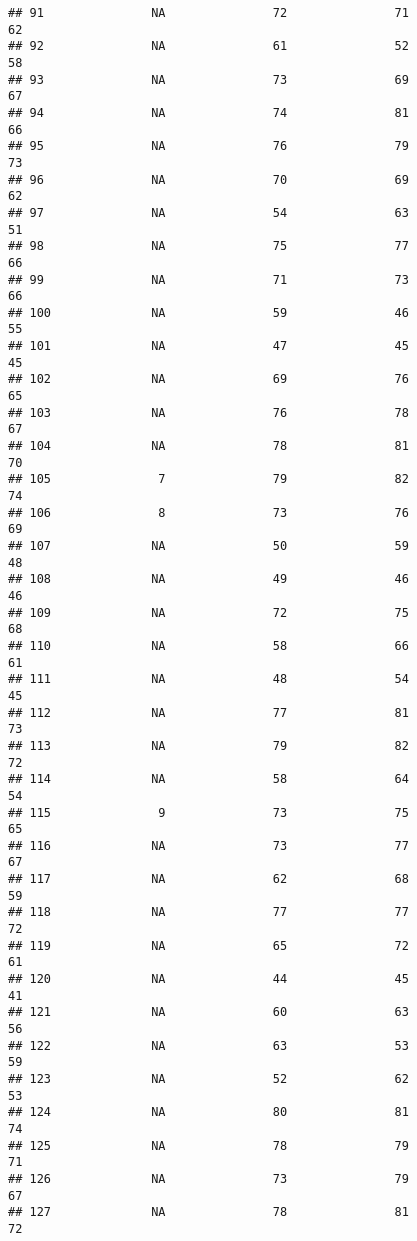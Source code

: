 \documentclass[]{article}
\begin{document}
\begin{verbatim}
## 91               NA               72               71             62
## 92               NA               61               52             58
## 93               NA               73               69             67
## 94               NA               74               81             66
## 95               NA               76               79             73
## 96               NA               70               69             62
## 97               NA               54               63             51
## 98               NA               75               77             66
## 99               NA               71               73             66
## 100              NA               59               46             55
## 101              NA               47               45             45
## 102              NA               69               76             65
## 103              NA               76               78             67
## 104              NA               78               81             70
## 105               7               79               82             74
## 106               8               73               76             69
## 107              NA               50               59             48
## 108              NA               49               46             46
## 109              NA               72               75             68
## 110              NA               58               66             61
## 111              NA               48               54             45
## 112              NA               77               81             73
## 113              NA               79               82             72
## 114              NA               58               64             54
## 115               9               73               75             65
## 116              NA               73               77             67
## 117              NA               62               68             59
## 118              NA               77               77             72
## 119              NA               65               72             61
## 120              NA               44               45             41
## 121              NA               60               63             56
## 122              NA               63               53             59
## 123              NA               52               62             53
## 124              NA               80               81             74
## 125              NA               78               79             71
## 126              NA               73               79             67
## 127              NA               78               81             72

\end{verbatim}
\end{document}

